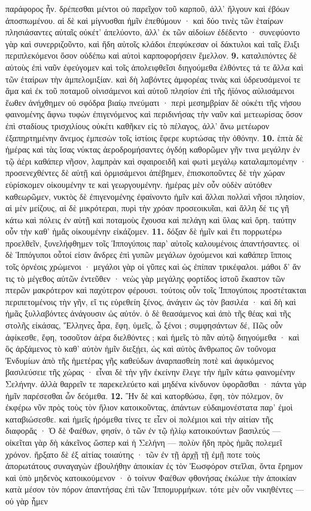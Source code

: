 \documentclass[a4paper, 11pt, oneside, polutonikogreek, german]{article}
\begin{document}
παράφορος ἦν. δρέπεσθαι μέντοι οὐ παρεῖχον τοῦ καρποῦ, ἀλλ' ἤλγουν καὶ ἐβόων ἀποσπωμένου. αἱ δὲ καὶ μίγνυσθαι ἡμῖν ἐπεθύμουν · καὶ δύο τινὲς τῶν ἑταίρων πλησιάσαντες αὐταῖς οὐκέτ' ἀπελύοντο, ἀλλ' ἐκ τῶν αἰδοίων ἐδέδεντο · συνεφύοντο γὰρ καὶ συνερριζοῦντο, καὶ ἤδη αὐτοῖς κλάδοι ἐπεφύκεσαν οἱ δάκτυλοι καὶ ταῖς ἕλιξι περιπλεκόμενοι ὅσον οὐδέπω καὶ αὐτοὶ καρποφορήσειν ἔμελλον. \textbf{9.} καταλιπόντες δὲ αὐτοὺς ἐπὶ ναῦν ἐφεύγομεν καὶ τοῖς ἀπολειφθεῖσι διηγούμεθα ἐλθόντες τά τε ἄλλα καὶ τῶν ἑταίρων τὴν ἀμπελομιξίαν. καὶ δὴ λαβόντες ἀμφορέας τινὰς καὶ ὑδρευσάμενοί τε ἅμα καὶ ἐκ τοῦ ποταμοῦ οἰνισάμενοι καὶ αὐτοῦ πλησίον ἐπὶ τῆς ἠϊόνος αὐλισάμενοι ἕωθεν ἀνήχθημεν οὐ σφόδρα βιαίῳ πνεύματι · περὶ μεσημβρίαν δὲ οὐκέτι τῆς νήσου φαινομένης ἄφνω τυφὼν ἐπιγενόμενος καὶ περιδινήσας τὴν ναῦν καὶ μετεωρίσας ὅσον ἐπὶ σταδίους τρισχιλίους οὐκέτι καθῆκεν εἰς τὸ πέλαγος, ἀλλ' ἄνω μετέωρον ἐξαπηρτημένην ἄνεμος ἐμπεσὼν τοῖς ἱστίοις ἔφερε κυρτώσας τὴν ὀθόνην. \textbf{10.} ἑπτὰ δὲ ἡμέρας καὶ τὰς ἴσας νύκτας ἀεροδρομήσαντες ὀγδόῃ καθορῶμεν γῆν τινα μεγάλην ἐν τῷ ἀέρι καθάπερ νῆσον, λαμπρὰν καὶ σφαιροειδῆ καὶ φωτὶ μεγάλῳ καταλαμπομένην · προσενεχθέντες δὲ αὐτῇ καὶ ὁρμισάμενοι ἀπέβημεν, ἐπισκοποῦντες δὲ τὴν χώραν εὑρίσκομεν οἰκουμένην τε καὶ γεωργουμένην. ἡμέρας μὲν οὖν οὐδὲν αὐτόθεν καθεωρῶμεν, νυκτὸς δὲ ἐπιγενομένης ἐφαίνοντο ἡμῖν καὶ ἄλλαι πολλαὶ νῆσοι πλησίον, αἱ μὲν μείζους, αἱ δὲ μικρότεραι, πυρὶ τὴν χρόαν προσεοικυῖαι, καὶ ἄλλη δέ τις γῆ κάτω καὶ πόλεις ἐν αὑτῇ καὶ ποταμοὺς ἔχουσα καὶ πελάγη καὶ ὕλας καὶ ὄρη. ταύτην οὖν τὴν καθ' ἡμἄς οἰκουμένην εἰκάζομεν. \textbf{11.} δόξαν δὲ ἡμῖν καὶ ἔτι πορρωτέρω προελθεῖν, ξυνελήφθημεν τοῖς Ἱππογύποις παρ' αὐτοῖς καλουμένοις ἀπαντήσαντες. οἱ δὲ Ἱππόγυποι οὗτοί εἰσιν ἄνδρες ἐπὶ γυπῶν μεγάλων ὀχούμενοι καὶ καθάπερ ἵπποις τοῖς ὀρνέοις χρώμενοι · μεγάλοι γὰρ οἱ γῦπες καὶ ὡς ἐπίπαν τρικέφαλοι. μάθοι δ' ἄν τις τὸ μέγεθος αὐτῶν ἐντεῦθεν · νεὼς γὰρ μεγάλης φορτίδος ἱστοῦ ἕκαστον τῶν πτερῶν μακρότερον καὶ παχύτερον φέρουσι. τούτοις οὖν τοῖς Ἱππογύποις προστέτακται περιπετομένοις τὴν γῆν, εἴ τις εὑρεθείη ξένος, ἀνάγειν ὡς τὸν βασιλέα · καὶ δὴ καὶ ἡμᾶς ξυλλαβόντες ἀνάγουσιν ὡς αὐτόν. ὁ δὲ θεασάμενος καὶ ἀπὸ τῆς θέας καὶ τῆς στολῆς εἰκάσας, Ἕλληνες ἆρα, ἔφη, ὑμεῖς, ὦ ξένοι ; συμφησάντων δέ, Πῶς οὖν ἀφίκεσθε, ἔφη, τοσοῦτον ἀέρα διελθόντες ; καὶ ἡμεῖς τὸ πᾶν αὐτῷ διηγούμεθα · καὶ ὃς ἀρξάμενος τὸ καθ' αὑτὸν ἡμῖν διεξῄει, ὡς καὶ αὐτὸς ἄνθρωπος ὢν τοὔνομα Ἐνδυμίων ἀπὸ τῆς ἡμετέρας γῆς καθεύδων ἀναρπασθείη ποτὲ καὶ ἀφικόμενος βασιλεύσειε τῆς χώρας · εἶναι δὲ τὴν γῆν ἐκείνην ἔλεγε τὴν ἡμῖν κάτω φαινομένην Σελήνην. ἀλλὰ θαρρεῖν τε παρεκελεύετο καὶ μηδένα κίνδυνον ὑφορᾶσθαι · πάντα γὰρ ἡμῖν παρέσεσθαι ὧν δεόμεθα. \textbf{12.} Ἢν δὲ καὶ κατορθώσω, ἔφη, τὸν πόλεμον, ὃν ἐκφέρω νῦν πρὸς τοὺς τὸν ἥλιον κατοικοῦντας, ἁπάντων εὐδαιμονέστατα παρ' ἐμοὶ καταβιώσεσθε. καὶ ἡμεῖς ἠρόμεθα τίνες τε εἶεν οἱ πολέμιοι καὶ τὴν αἰτίαν τῆς διαφορἄς · Ὁ δὲ Φαέθων, φησίν, ὁ τῶν ἐν τῷ ἡλίῳ κατοικούντων βασιλεύς --- οἰκεῖται γὰρ δὴ κἀκεῖνος ὥσπερ καὶ ἡ Σελήνη --- πολὺν ἤδη πρὸς ἡμᾶς πολεμεῖ χρόνον. ἤρξατο δὲ ἐξ αἰτίας τοιαύτης · τῶν ἐν τῇ ἀρχῇ τῇ ἐμῇ ποτε τοὺς ἀπορωτάτους συναγαγὼν ἐβουλήθην ἀποικίαν ἐς τὸν Ἑωσφόρον στεῖλαι, ὄντα ἔρημον καὶ ὑπὸ μηδενὸς κατοικούμενον · ὁ τοίνυν Φαέθων φθονήσας ἐκώλυε τὴν ἀποικίαν κατὰ μέσον τὸν πόρον ἀπαντήσας ἐπὶ τῶν Ἱππομυρμήκων. τότε μὲν οὖν νικηθέντες --- οὐ γὰρ ἦμεν 
\end{document}
